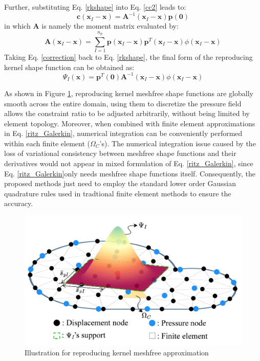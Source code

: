 Further, substituting Eq. \ref{rkshape} into Eq. \eqref{cc2} leads to:
\begin{equation}\label{correction}
\boldsymbol{c}(\boldsymbol{x}_I-\boldsymbol{x}) = \boldsymbol{A}^{-1}(\boldsymbol{x}_I-\boldsymbol{x}) \boldsymbol{p}(\boldsymbol{0})
\end{equation}
in which $\boldsymbol{A}$ is namely the moment matrix evaluated by:
\begin{equation}
\boldsymbol{A}(\boldsymbol{x}_I-\boldsymbol{x}) = \sum_{I=1}^{n_p} \boldsymbol{p}(\boldsymbol{x}_I-\boldsymbol{x}) \boldsymbol{p}^T(\boldsymbol{x}_I-\boldsymbol{x}) \phi(\boldsymbol{x}_I-\boldsymbol{x})
\end{equation}
Taking Eq. \eqref{correction} back to Eq. \eqref{rkshape}, the final form of the reproducing kernel shape function can be obtained as:
\begin{equation}
\Psi_I(\boldsymbol{x}) = \boldsymbol{p}^T(\boldsymbol{0}) \boldsymbol{A}^{-1}(\boldsymbol{x}_I-\boldsymbol{x}) \phi(\boldsymbol{x}_I-\boldsymbol{x})
\end{equation}

As shown in Figure \ref{fg:rk_approximation},
reproducing kernel meshfree shape functions are globally smooth across the entire domain,
using them to discretize the pressure field allows the constraint ratio to be adjusted arbitrarily, without being limited by element topology.
Moreover,
when combined with finite element approximations in Eq. \ref{ritz_Galerkin},
numerical integration can be conveniently performed within each finite element ($\Omega_C$'s).
The numerical integration issue caused by the loss of variational consistency between meshfree shape functions and their derivatives would not appear in mixed formulation of Eq. \ref{ritz_Galerkin}, since Eq. \ref{ritz_Galerkin}only needs meshfree shape functions itself. 
Consequently, the proposed methods just need to employ the standard lower order Gaussian quadrature rules used in tradtional finite element methods to ensure the accuracy.

\begin{figure}[H]
\centering
\includegraphics[width=\textwidth]{png/mix.png}
\caption{Illustration for reproducing kernel meshfree approximation}\label{fg:rk_approximation}
\end{figure}

